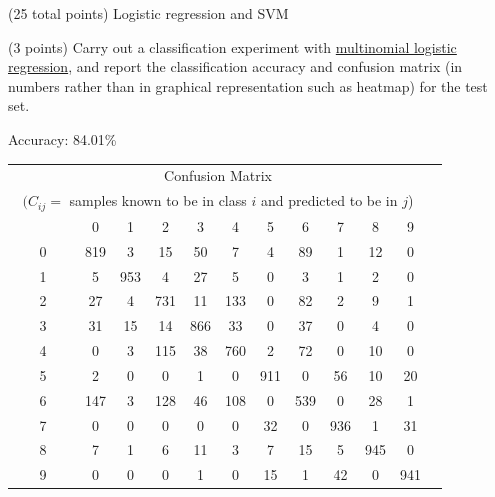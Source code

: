 \documentclass[12pt]{article}
\begin{document}
\begin{question}{(25 total points) Logistic regression and SVM}

  


  \medskip
   \begin{subquestion}{(3 points)
       Carry out a classification experiment with
       \href{https://scikit-learn.org/0.19/modules/generated/sklearn.linear\_model.LogisticRegression.html}{multinomial logistic regression},
       and report the classification accuracy and confusion matrix (in
       numbers rather than in graphical representation such as heatmap)
       for the test set.
     } \label{Q2.1}


   

      \begin{answerbox}{30em}
      Accuracy: 84.01\% \\
    		\begin{tabular}{|c|c|c|c|c|c|c|c|c|c|c|c|}
      		\hline 
      		\multicolumn{11}{|c|}{Confusion Matrix}\\
      		\multicolumn{11}{|c|}{$(C_{ij} = $ samples known to be in class $i$ and predicted to be in $j$)}
      		 \\ \hline
\ \ \ \ \ \ \ \ & 0 & 1 & 2 & 3 & 4 & 5 & 6 & 7 & 8 & 9\\ \hline
0 & 819 & 3 & 15 & 50 & 7 & 4 & 89 & 1 & 12 & 0 \\ \hline 
1 & 5 & 953 & 4 & 27 & 5 & 0 & 3 & 1 & 2 & 0 \\ \hline 
2 & 27 & 4 & 731 & 11 & 133 & 0 & 82 & 2 & 9 & 1 \\ \hline 
3 & 31 & 15 & 14 & 866 & 33 & 0 & 37 & 0 & 4 & 0 \\ \hline 
4 & 0 & 3 & 115 & 38 & 760 & 2 & 72 & 0 & 10 & 0 \\ \hline 
5 & 2 & 0 & 0 & 1 & 0 & 911 & 0 & 56 & 10 & 20 \\ \hline 
6 & 147 & 3 & 128 & 46 & 108 & 0 & 539 & 0 & 28 & 1 \\ \hline 
7 & 0 & 0 & 0 & 0 & 0 & 32 & 0 & 936 & 1 & 31 \\ \hline 
8 & 7 & 1 & 6 & 11 & 3 & 7 & 15 & 5 & 945 & 0 \\ \hline 
9 & 0 & 0 & 0 & 1 & 0 & 15 & 1 & 42 & 0 & 941
			\\\hline
      		\end{tabular} 
      \end{answerbox}
  



\end{subquestion}
\end{question}
\end{document}
